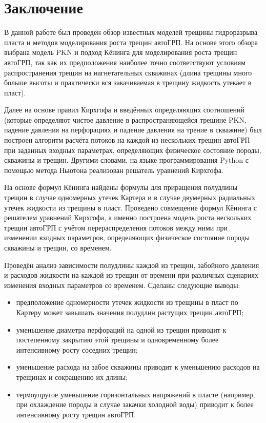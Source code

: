 \chapter*{Заключение} \label{ch-conclusion}

В данной работе был проведён обзор известных моделей трещины гидроразрыва пласта и методов моделирования роста трещин автоГРП.
На основе этого обзора выбрана модель PKN и подход Кёнинга для моделирования роста трещин автоГРП, так как их предположения наиболее точно соответствуют условиям распространения трещин на нагнетательных скважинах (длина трещины много больше высоты и практически вся закачиваемая в трещину жидкость утекает в пласт). 

Далее на основе правил Кирхгофа и введённых определяющих соотношений (которые определяют чистое давление в распространяющейся трещине PKN, падение давления на перфорациях и падение давления на трение в скважине) был построен алгоритм расчёта потоков на каждой из нескольких трещин автоГРП при заданных входных параметрах, определяющих физическое состояние породы, скважины и трещин.
Другими словами, на языке программирования Python с помощью метода Ньютона реализован решатель уравнений Кирхгофа.

На основе формул Кёнинга найдены формулы для приращения полудлины трещин в случае одномерных утечек Картера и в случае двумерных радиальных утечек жидкости из трещины в пласт.
Проведено совмещение формул Кёнинга с решателем уравнений Кирхгофа, а именно построена модель роста нескольких трещин автоГРП с учётом перераспределения потоков между ними при изменении входных параметров, определяющих физическое состояние породы скважины и трещин, со временем.

Проведён анализ зависимости полудлины каждой из трещин, забойного давления и расходов жидкости на каждой из трещин от времени при различных сценариях изменения входных параметров со временем. Сделаны следующие выводы:
\begin{itemize}
	\item предположение одномерности утечек жидкости из трещины в пласт по Картеру может завышать значения полудлин растущих трещин автоГРП;
	\item уменьшение диаметра перфораций на одной из трещин приводит к постепенному закрытию этой трещины и одновременному более интенсивному росту соседних трещин;
	\item уменьшение расхода на забое скважины приводит к уменьшению расходов на трещинах и сокращению их длины;
	\item термоупругое уменьшение горизонтальных напряжений в пласте (например, при охлаждение породы в случае закачки холодной воды) приводит к более интенсивному росту трещин автоГРП.
\end{itemize}

